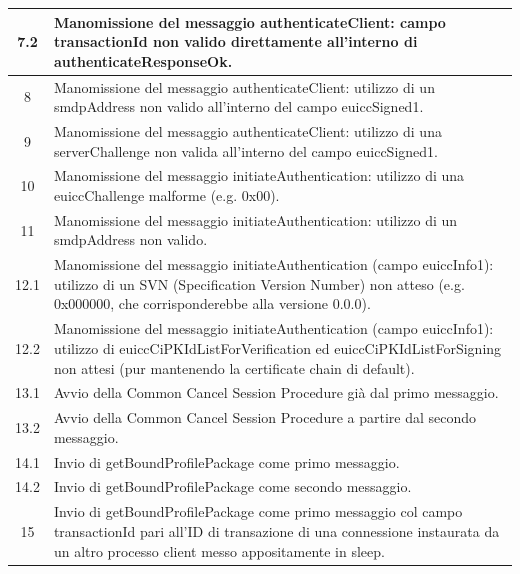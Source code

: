 \documentclass[10pt, oneside]{book}
\begin{document}
\begin{table}[h!]
\begin{center}
\begin{tabularx}{\textwidth}{|c|X|}
\hline
7.2 & Manomissione del messaggio authenticateClient: campo transactionId non valido direttamente all'interno di authenticateResponseOk.\\
\hline
8 & Manomissione del messaggio authenticateClient: utilizzo di un smdpAddress non valido all'interno del campo euiccSigned1.\\
\hline
9 & Manomissione del messaggio authenticateClient: utilizzo di una serverChallenge non valida all'interno del campo euiccSigned1.\\
\hline
10 & Manomissione del messaggio initiateAuthentication: utilizzo di una euiccChallenge malforme (e.g. 0x00).\\
\hline
11 & Manomissione del messaggio initiateAuthentication: utilizzo di un smdpAddress non valido.\\
\hline
12.1 & Manomissione del messaggio initiateAuthentication (campo euiccInfo1): utilizzo di un SVN (Specification Version Number) non atteso (e.g. 0x000000, che corrisponderebbe alla versione 0.0.0).\\
\hline
12.2 & Manomissione del messaggio initiateAuthentication (campo euiccInfo1): utilizzo di euiccCiPKIdListForVerification ed euiccCiPKIdListForSigning non attesi (pur mantenendo la certificate chain di default).\\
\hline
13.1 & Avvio della Common Cancel Session Procedure già dal primo messaggio.\\
\hline
13.2 & Avvio della Common Cancel Session Procedure a partire dal secondo messaggio.\\
\hline
14.1 & Invio di getBoundProfilePackage come primo messaggio.\\
\hline
14.2 & Invio di getBoundProfilePackage come secondo messaggio.\\
\hline
15 & Invio di getBoundProfilePackage come primo messaggio col campo transactionId pari all'ID di transazione di una connessione instaurata da un altro processo client messo appositamente in sleep.\\
\hline
\end{tabularx}
\end{center}
\end{table}
\end{document}
